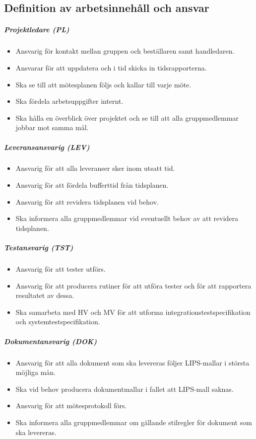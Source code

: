 \documentclass[a4paper,11pt]{article}
\begin{document}
\subsection{Definition av arbetsinnehåll och ansvar}
\subparagraph{Projektledare (PL)}
\begin{itemize}
\item Ansvarig för kontakt mellan gruppen och beställaren samt handledaren.
\item Ansvarar för att uppdatera och i tid skicka in tidsrapporterna.
\item Ska se till att mötesplanen följs och kallar till varje möte.
\item Ska fördela arbetsuppgifter internt.
\item Ska hålla en överblick över projektet och se till att alla gruppmedlemmar jobbar mot samma mål.
\end{itemize}

\subparagraph{Leveransansvarig (LEV)}
\begin{itemize}
\item Ansvarig för att alla leveranser sker inom utsatt tid.
\item Ansvarig för att fördela bufferttid från tidsplanen.
\item Ansvarig för att revidera tidsplanen vid behov.
\item Ska informera alla gruppmedlemmar vid eventuellt behov av att revidera tidsplanen.
\end{itemize}

\subparagraph{Testansvarig (TST)}
\begin{itemize}
\item Ansvarig för att tester utförs.
\item Ansvarig för att producera rutiner för att utföra tester och för att rapportera resultatet av dessa.
\item Ska samarbeta med HV och MV för att utforma integrationstestspecifikation och systemtestspecifikation. 
\end{itemize}

\subparagraph{Dokumentansvarig (DOK)}
\begin{itemize}
\item Ansvarig för att alla dokument som ska levereras följer LIPS-mallar i största möjliga mån.
\item Ska vid behov producera dokumentmallar i fallet att LIPS-mall saknas.
\item Ansvarig för att mötesprotokoll förs.
\item Ska informera alla gruppmedlemmar om gällande stilregler för dokument som ska levereras.
\end{itemize}
\end{document}
